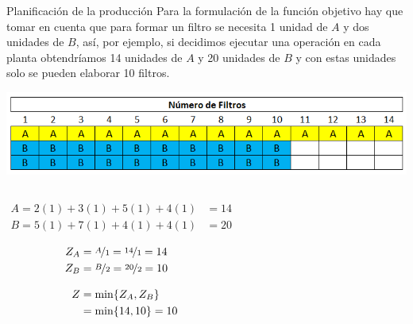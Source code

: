 \documentclass[../../main.tex]{subfiles}
\begin{document}
\begin{frame}{Planificación de la producción}{}
  Para la formulación de la función objetivo hay que tomar en cuenta que para formar un filtro se necesita 1 unidad de $A$ y dos unidades de $B$, así, por ejemplo, si decidimos ejecutar una operación en cada planta obtendríamos 14 unidades de $A$ y 20 unidades de $B$ y con estas unidades solo se pueden elaborar 10 filtros.

  {\centering
    \includegraphics[scale=0.35]{05_production-planning.png}
    \par}

  \begin{columns}
      \begin{align*}
    A = 2(1) + 3(1) + 5(1) + 4(1)  &= 14\\
    B = 5(1) + 7(1) + 4(1) + 4(1)  &= 20\\
  \end{align*}
      \begin{align*}
        Z_A &= \nicefrac{A}{1} = \nicefrac{14}{1} = 14\\
        Z_B &= \nicefrac{B}{2} = \nicefrac{20}{2} = 10\\[3mm]
        Z &= \min\{Z_A, Z_B \}\\
        &= \min\{14, 10 \} = 10
      \end{align*}
  \end{columns}



  
\end{frame}
\end{document}
